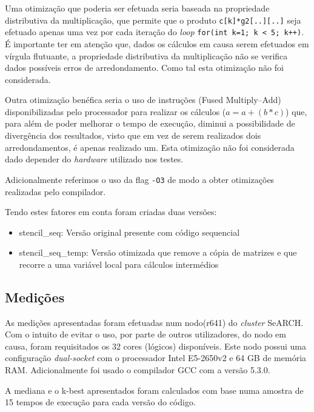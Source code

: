 \documentclass{article}
\begin{document}
Uma otimização que poderia ser efetuada seria baseada na propriedade distributiva da multiplicação, que permite que o produto \texttt{c[k]*g2[..][..]} seja efetuado apenas
uma vez por cada iteração do \textit{loop} \texttt{for(int k=1; k < 5; k++)}. É importante ter em atenção que, dados os cálculos em causa serem efetuados em
vírgula flutuante, a propriedade distributiva da multiplicação não se verifica dados possíveis erros de arredondamento. Como tal esta otimização não foi considerada.

Outra otimização benéfica seria o uso de instruções (Fused Multiply–Add) disponibilizadas pelo processador para realizar os cálculos ($a = a + (b*c)$) que, para além de poder melhorar o tempo de execução, diminui a possibilidade de divergência dos resultados, visto que em vez de serem realizados dois arredondamentos, é apenas realizado um. Esta otimização não foi considerada dado depender do \textit{hardware} utilizado nos testes.

Adicionalmente referimos o uso da flag \texttt{-O3} de modo a obter otimizações realizadas pelo compilador.

Tendo estes fatores em conta foram criadas duas versões:
\begin{itemize}
    \item stencil\_seq: Versão original presente com código sequencial
    \item stencil\_seq\_temp: Versão otimizada que remove a cópia de matrizes e  que recorre a uma variável local para cálculos intermédios
\end{itemize}

\subsection{Medições}
As medições apresentadas foram efetuadas num nodo(r641) do \textit{cluster} SeARCH. Com o intuito de evitar o uso, por parte de outros utilizadores, do nodo em causa, foram requisitados os 32 cores (lógicos) disponíveis. 
Este nodo possui uma configuração \textit{dual-socket} com o processador Intel E5-2650v2 e 64 GB de memória RAM. Adicionalmente foi usado o compilador GCC com a versão 5.3.0.

A mediana e o k-best apresentados foram calculados com base numa amostra de 15 tempos de execução para cada versão do código.
\end{document}
